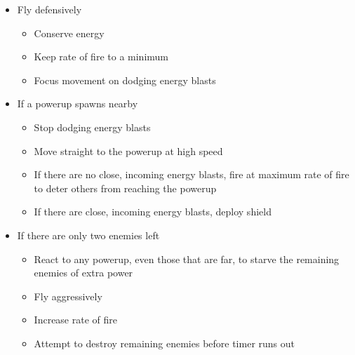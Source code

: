\begin{itemize}
\item Fly defensively
	\begin{itemize}
	\item Conserve energy
	\item Keep rate of fire to a minimum
	\item Focus movement on dodging energy blasts
	\end{itemize}
\item If a powerup spawns nearby
	\begin{itemize}
	\item Stop dodging energy blasts
	\item Move straight to the powerup at high speed
	\item If there are no close, incoming energy blasts, fire at maximum rate of fire to deter others from reaching the powerup
	\item If there are close, incoming energy blasts, deploy shield
	\end{itemize}
\item If there are only two enemies left
	\begin{itemize}
	\item React to any powerup, even those that are far, to starve the remaining enemies of extra power
	\item Fly aggressively
	\item Increase rate of fire
	\item Attempt to destroy remaining enemies before timer runs out
	\end{itemize}
\end{itemize}